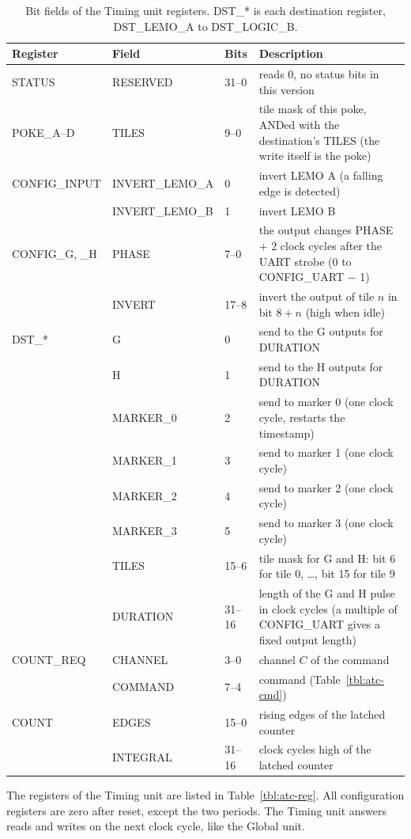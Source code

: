 \documentclass[12pt]{article}
\begin{document}
\begin{table}[htbp]
\caption{\label{tbl:atc-bits} Bit fields of the Timing unit registers.  DST\_* is each destination register,
  DST\_LEMO\_A to DST\_LOGIC\_B.}
\begin{center}\small
\begin{tabularx}{\textwidth}{lllL}
\toprule
Register        & Field          & Bits   & Description \\
\midrule
STATUS          & RESERVED       & 31--0  & reads 0, no status bits in this version \\
\midrule
POKE\_A--D      & TILES          & 9--0   & tile mask of this poke, ANDed with the destination's TILES (the write itself is the poke) \\
\midrule
CONFIG\_INPUT   & INVERT\_LEMO\_A & 0     & invert LEMO A (a falling edge is detected) \\
                & INVERT\_LEMO\_B & 1     & invert LEMO B \\
\midrule
CONFIG\_G, \_H  & PHASE          & 7--0   & the output changes PHASE + 2 clock cycles after the UART strobe (0 to CONFIG\_UART $-$ 1) \\
                & INVERT         & 17--8  & invert the output of tile $n$ in bit $8 + n$ (high when idle) \\
\midrule
DST\_*          & G              & 0      & send to the G outputs for DURATION \\
                & H              & 1      & send to the H outputs for DURATION \\
                & MARKER\_0      & 2      & send to marker 0 (one clock cycle, restarts the timestamp) \\
                & MARKER\_1      & 3      & send to marker 1 (one clock cycle) \\
                & MARKER\_2      & 4      & send to marker 2 (one clock cycle) \\
                & MARKER\_3      & 5      & send to marker 3 (one clock cycle) \\
                & TILES          & 15--6  & tile mask for G and H:  bit 6 for tile 0, \ldots, bit 15 for tile 9 \\
                & DURATION       & 31--16 & length of the G and H pulse in clock cycles (a multiple of CONFIG\_UART gives a fixed output length) \\
\midrule
COUNT\_REQ      & CHANNEL        & 3--0   & channel $C$ of the command \\
                & COMMAND        & 7--4   & command (Table~\ref{tbl:atc-cmd}) \\
\midrule
COUNT           & EDGES          & 15--0  & rising edges of the latched counter \\
                & INTEGRAL       & 31--16 & clock cycles high of the latched counter \\
\bottomrule
\end{tabularx}
\end{center}
\end{table}

The registers of the Timing unit are listed in Table~\ref{tbl:atc-reg}.  All configuration registers are
zero after reset, except the two periods.  The Timing unit answers reads and writes on the next clock cycle,
like the Global unit.
\end{document}
